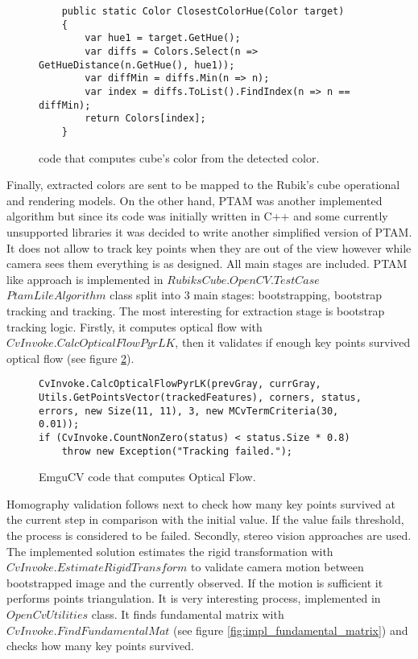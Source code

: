 \documentclass[../../main.tex]{subfiles}
\begin{document}
\begin{figure} [!ht]
\centering    
\lstset{style=sharpc}
    \begin{lstlisting}
    public static Color ClosestColorHue(Color target)
    {
        var hue1 = target.GetHue();
        var diffs = Colors.Select(n => GetHueDistance(n.GetHue(), hue1));
        var diffMin = diffs.Min(n => n);
        var index = diffs.ToList().FindIndex(n => n == diffMin);
        return Colors[index];
    }       
    \end{lstlisting}
\caption{{\Charp} code that computes cube's color from the detected color.}
\label{fig:impl_hue_color}
\end{figure}

Finally, extracted colors are sent to be mapped to the Rubik's cube operational and rendering models.
On the other hand, \ac{PTAM} was another implemented algorithm but since its code was initially written in C++ and some currently unsupported libraries it was decided to write another simplified version of \ac{PTAM}. It does not allow to track key points when they are out of the view however while camera sees them everything is as designed. All main stages are included. \ac{PTAM} like approach is implemented in $RubiksCube.OpenCV.TestCase$ $PtamLileAlgorithm$ class split into 3 main stages: bootstrapping, bootstrap tracking and tracking. The most interesting for extraction stage is bootstrap tracking logic. Firstly, it computes optical flow with $CvInvoke.CalcOpticalFlowPyrLK$, then it validates if enough key points survived optical flow (see figure \ref{fig:impl_calc_optical_flow}).

\begin{figure} [!ht]
\centering    
\lstset{style=sharpc}
    \begin{lstlisting}
CvInvoke.CalcOpticalFlowPyrLK(prevGray, currGray, Utils.GetPointsVector(trackedFeatures), corners, status, errors, new Size(11, 11), 3, new MCvTermCriteria(30, 0.01));
if (CvInvoke.CountNonZero(status) < status.Size * 0.8)
    throw new Exception("Tracking failed.");
    \end{lstlisting}
\caption{EmguCV code that computes Optical Flow.}
\label{fig:impl_calc_optical_flow}
\end{figure}

Homography validation follows next to check how many key points survived at the current step in comparison with the initial value. If the value fails threshold, the process is considered to be failed. Secondly, stereo vision approaches are used. The implemented solution estimates the rigid transformation with $CvInvoke.EstimateRigidTransform$ to validate camera motion between bootstrapped image and the currently observed. If the motion is sufficient it performs points triangulation. It is very interesting process, implemented in $OpenCvUtilities$ class. It finds fundamental matrix with $CvInvoke.FindFundamentalMat$ (see figure \ref{fig:impl_fundamental_matrix}) and checks how many key points survived.
\end{document}
